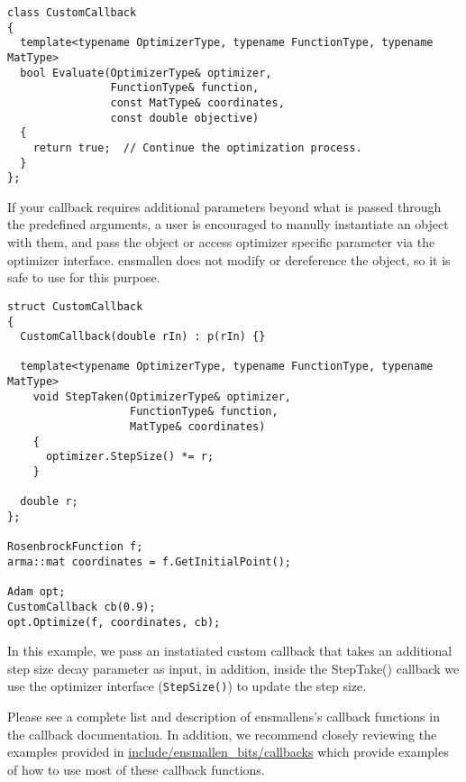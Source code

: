 \begin{verbatim}
class CustomCallback
{
  template<typename OptimizerType, typename FunctionType, typename MatType>
  bool Evaluate(OptimizerType& optimizer,
                FunctionType& function,
                const MatType& coordinates,
                const double objective)
  {
    return true;  // Continue the optimization process.
  }
};
\end{verbatim}

If your callback requires additional parameters beyond what is passed through
the predefined arguments, a user is encouraged to manully instantiate an object
with them, and pass the object or access optimizer specific parameter via the
optimizer interface. ensmallen does not modify or dereference the object, so it
is safe to use for this purpose.

\begin{verbatim}
struct CustomCallback
{
  CustomCallback(double rIn) : p(rIn) {}

  template<typename OptimizerType, typename FunctionType, typename MatType>
    void StepTaken(OptimizerType& optimizer,
                   FunctionType& function,
                   MatType& coordinates)
    {
      optimizer.StepSize() *= r;
    }

  double r;
};

RosenbrockFunction f;
arma::mat coordinates = f.GetInitialPoint();

Adam opt;
CustomCallback cb(0.9);
opt.Optimize(f, coordinates, cb);
\end{verbatim}

In this example, we pass an instatiated custom callback that takes an additional
step size decay parameter as input, in addition, inside the StepTake() callback
we use the optimizer interface ({\tt StepSize()}) to update the step size.

Please see a complete list and description of ensmallens's callback functions in
the callback documentation. In addition, we recommend closely reviewing the
examples provided in
\url{include/ensmallen_bits/callbacks}
which provide examples of how to use most of these callback functions.




